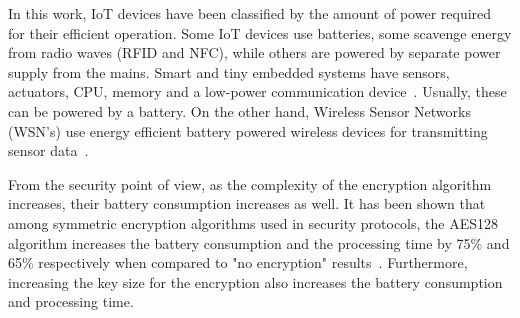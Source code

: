 \documentclass{siamltex}
\begin{document}
In this work, IoT devices have been classified by the amount of power required
for their efficient operation. Some IoT devices use batteries, some scavenge
energy from radio waves (RFID and NFC), while others are powered by separate
power supply from the mains.  Smart and tiny embedded systems
have sensors, actuators, CPU, memory and a low-power communication
device~\cite{lopez2012adding}. Usually, these can be powered by a battery. On
the other hand, Wireless Sensor Networks (WSN's)
use energy efficient battery powered wireless devices for transmitting
sensor data~\cite{akyildiz2002wireless}.

From the security point of view, as the complexity of the encryption algorithm
increases, their battery consumption increases as well. It has been shown that
among symmetric encryption algorithms used in security protocols, the AES128 algorithm
increases the battery consumption and the processing time by 75\% and 65\%
respectively when compared to "no encryption" results~\cite{hamad2009energy}.
Furthermore, increasing the key size for the encryption also increases the
battery consumption and processing time.




\end{document}
